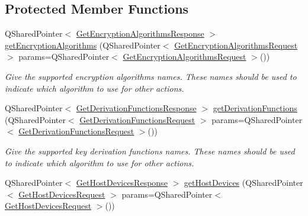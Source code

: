 \subsection*{Protected Member Functions}
\begin{DoxyCompactItemize}
\item 
Q\+Shared\+Pointer$<$ \hyperlink{struct_gost_crypt_1_1_core_1_1_get_encryption_algorithms_response}{Get\+Encryption\+Algorithms\+Response} $>$ \hyperlink{class_gost_crypt_1_1_core_1_1_core_base_a1f0f9505278a7ddde8b4b6d341f0beda}{get\+Encryption\+Algorithms} (Q\+Shared\+Pointer$<$ \hyperlink{struct_gost_crypt_1_1_core_1_1_get_encryption_algorithms_request}{Get\+Encryption\+Algorithms\+Request} $>$ params=Q\+Shared\+Pointer$<$ \hyperlink{struct_gost_crypt_1_1_core_1_1_get_encryption_algorithms_request}{Get\+Encryption\+Algorithms\+Request} $>$())
\begin{DoxyCompactList}\small\item\em Give the supported encryption algorithms names. These names should be used to indicate which algorithm to use for other actions. \end{DoxyCompactList}\item 
Q\+Shared\+Pointer$<$ \hyperlink{struct_gost_crypt_1_1_core_1_1_get_derivation_functions_response}{Get\+Derivation\+Functions\+Response} $>$ \hyperlink{class_gost_crypt_1_1_core_1_1_core_base_a2b55f015a063b69a371aa0136aa82434}{get\+Derivation\+Functions} (Q\+Shared\+Pointer$<$ \hyperlink{struct_gost_crypt_1_1_core_1_1_get_derivation_functions_request}{Get\+Derivation\+Functions\+Request} $>$ params=Q\+Shared\+Pointer$<$ \hyperlink{struct_gost_crypt_1_1_core_1_1_get_derivation_functions_request}{Get\+Derivation\+Functions\+Request} $>$())
\begin{DoxyCompactList}\small\item\em Give the supported key derivation functions names. These names should be used to indicate which algorithm to use for other actions. \end{DoxyCompactList}\item 
Q\+Shared\+Pointer$<$ \hyperlink{struct_gost_crypt_1_1_core_1_1_get_host_devices_response}{Get\+Host\+Devices\+Response} $>$ \hyperlink{class_gost_crypt_1_1_core_1_1_core_base_ab63be029cc98da2fc116c4223908213e}{get\+Host\+Devices} (Q\+Shared\+Pointer$<$ \hyperlink{struct_gost_crypt_1_1_core_1_1_get_host_devices_request}{Get\+Host\+Devices\+Request} $>$ params=Q\+Shared\+Pointer$<$ \hyperlink{struct_gost_crypt_1_1_core_1_1_get_host_devices_request}{Get\+Host\+Devices\+Request} $>$())

\end{DoxyCompactItemize}
